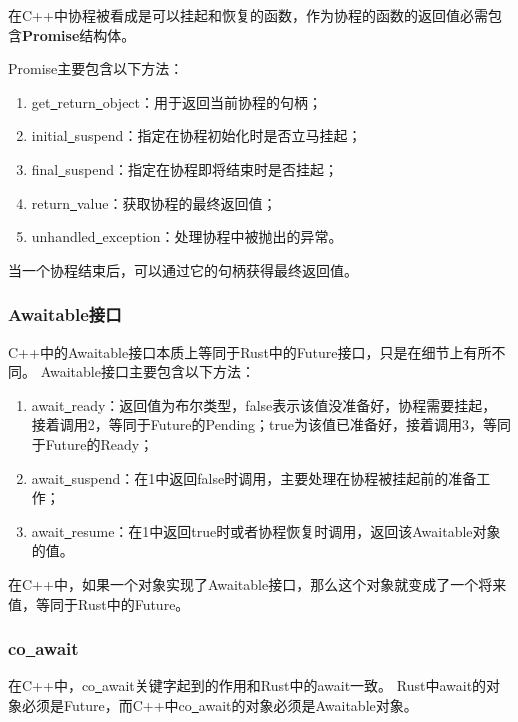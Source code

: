 \documentclass[supercite]{HustGraduPaper}
\theoremstyle{definition}
\begin{document}
在C++中协程被看成是可以挂起和恢复的函数，作为协程的函数的返回值必需包含\textbf{Promise}结构体。\par

Promise主要包含以下方法：

\begin{enumerate}
  \item get\underline{~}return\underline{~}object：用于返回当前协程的句柄；
  \item initial\underline{~}suspend：指定在协程初始化时是否立马挂起；
  \item final\underline{~}suspend：指定在协程即将结束时是否挂起；
  \item return\underline{~}value：获取协程的最终返回值；
  \item unhandled\underline{~}exception：处理协程中被抛出的异常。
\end{enumerate}

当一个协程结束后，可以通过它的句柄获得最终返回值。\par

\subsubsection{Awaitable接口}

C++中的Awaitable接口本质上等同于Rust中的Future接口，只是在细节上有所不同。
Awaitable接口主要包含以下方法：

\begin{enumerate}
  \item await\underline{~}ready：返回值为布尔类型，false表示该值没准备好，协程需要挂起，
    接着调用2，等同于Future的Pending；true为该值已准备好，接着调用3，等同于Future的Ready；
  \item await\underline{~}suspend：在1中返回false时调用，主要处理在协程被挂起前的准备工作；
  \item await\underline{~}resume：在1中返回true时或者协程恢复时调用，返回该Awaitable对象的值。
\end{enumerate}

在C++中，如果一个对象实现了Awaitable接口，那么这个对象就变成了一个将来值，等同于Rust中的Future。\par

\subsubsection{co\underline{~}await}
在C++中，co\underline{~}await关键字起到的作用和Rust中的await一致。
Rust中await的对象必须是Future，而C++中co\underline{~}await的对象必须是Awaitable对象。\par
\end{document}
